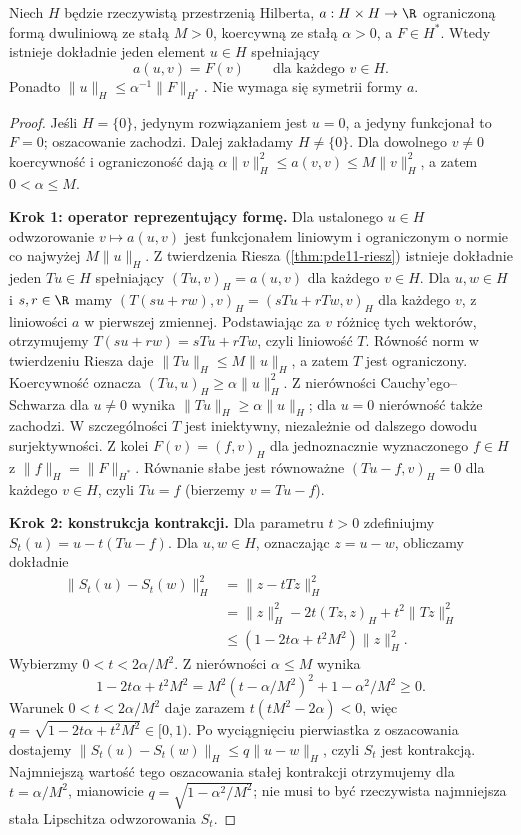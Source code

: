 \begin{twierdzenie}
\label{thm:pde11-LM}
Niech $H$ będzie rzeczywistą przestrzenią Hilberta,
$a:H\times H\to\R$ ograniczoną formą dwuliniową
ze stałą $M>0$, koercywną ze stałą $\alpha>0$,
a $F\in H^*$. Wtedy istnieje dokładnie jeden element $u\in H$
spełniający
\[ a(u,v)=F(v)\qquad\text{dla każdego }v\in H. \]
Ponadto $\|u\|_H\le\alpha^{-1}\|F\|_{H^*}$.
Nie wymaga się symetrii formy $a$.
\end{twierdzenie}
\begin{proof}
Jeśli $H=\{0\}$, jedynym rozwiązaniem jest $u=0$,
a jedyny funkcjonał to $F=0$; oszacowanie zachodzi.
Dalej zakładamy $H\ne\{0\}$. Dla dowolnego $v\ne0$
koercywność i ograniczoność dają
$\alpha\|v\|_H^2\le a(v,v)\le M\|v\|_H^2$,
a zatem $0<\alpha\le M$.

\textbf{Krok 1: operator reprezentujący formę.}
Dla ustalonego $u\in H$ odwzorowanie $v\mapsto a(u,v)$
jest funkcjonałem liniowym i ograniczonym o normie
co najwyżej $M\|u\|_H$. Z twierdzenia Riesza
(\ref{thm:pde11-riesz}) istnieje dokładnie jeden
$Tu\in H$ spełniający
$(Tu,v)_H=a(u,v)$ dla każdego $v\in H$.
Dla $u,w\in H$ i $s,r\in\R$ mamy
$(T(su+rw),v)_H=(sTu+rTw,v)_H$ dla każdego $v$,
z liniowości $a$ w pierwszej zmiennej.
Podstawiając za $v$ różnicę tych wektorów, otrzymujemy
$T(su+rw)=sTu+rTw$, czyli liniowość $T$.
Równość norm w twierdzeniu Riesza daje
$\|Tu\|_H\le M\|u\|_H$, a zatem $T$ jest ograniczony.
Koercywność oznacza $(Tu,u)_H\ge\alpha\|u\|_H^2$.
Z nierówności Cauchy'ego--Schwarza dla $u\ne0$
wynika $\|Tu\|_H\ge\alpha\|u\|_H$; dla $u=0$
nierówność także zachodzi. W szczególności $T$
jest iniektywny, niezależnie od dalszego dowodu surjektywności.
Z kolei $F(v)=(f,v)_H$ dla jednoznacznie wyznaczonego
$f\in H$ z $\|f\|_H=\|F\|_{H^*}$.
Równanie słabe jest równoważne $(Tu-f,v)_H=0$
dla każdego $v\in H$, czyli $Tu=f$ (bierzemy $v=Tu-f$).

\textbf{Krok 2: konstrukcja kontrakcji.}
Dla parametru $t>0$ zdefiniujmy
$S_t(u)=u-t(Tu-f)$. Dla $u,w\in H$, oznaczając $z=u-w$,
obliczamy dokładnie
\begin{align*}
\|S_t(u)-S_t(w)\|_H^2
&=\|z-tTz\|_H^2\\
&=\|z\|_H^2-2t(Tz,z)_H+t^2\|Tz\|_H^2\\
&\le (1-2t\alpha+t^2M^2)\|z\|_H^2.
\end{align*}
Wybierzmy $0<t<2\alpha/M^2$.
Z nierówności $\alpha\le M$ wynika
\[
 1-2t\alpha+t^2M^2
 =M^2(t-\alpha/M^2)^2+1-\alpha^2/M^2\ge0.
\]
Warunek $0<t<2\alpha/M^2$ daje zarazem
$t(tM^2-2\alpha)<0$, więc
$q=\sqrt{1-2t\alpha+t^2M^2}\in[0,1)$.
Po wyciągnięciu pierwiastka z oszacowania dostajemy
$\|S_t(u)-S_t(w)\|_H\le q\|u-w\|_H$,
czyli $S_t$ jest kontrakcją.
Najmniejszą wartość tego oszacowania stałej kontrakcji
otrzymujemy dla $t=\alpha/M^2$, mianowicie
$q=\sqrt{1-\alpha^2/M^2}$; nie musi to być rzeczywista
najmniejsza stała Lipschitza odwzorowania $S_t$.


\end{proof}
